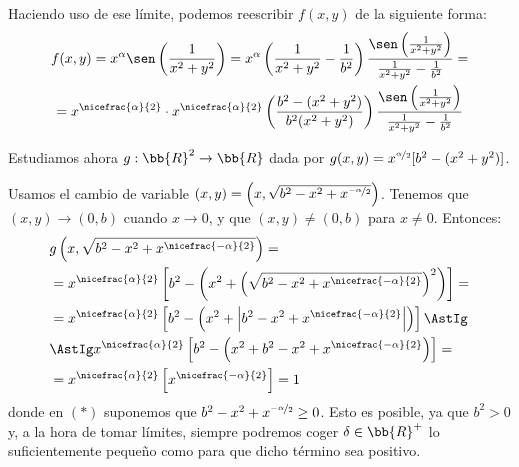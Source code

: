 \begin{ejercicio}
\begin{enumerate}
\begin{enumerate}
            Haciendo uso de ese límite, podemos reescribir $f(x,y)$ de la siguiente forma:
            \begin{multline*}
                f(x,y)=x^\alpha \sen\left(\frac{1}{x^2+y^2}\right)
                = x^\alpha \left(\frac{1}{x^2+y^2} - \frac{1}{b^2}\right) \frac{\sen\left(\frac{1}{x^2+y^2}\right)}{\frac{1}{x^2+y^2} - \frac{1}{b^2}}
                =\\= x^{\nicefrac{\alpha}{2}}\cdot x^{\nicefrac{\alpha}{2}} \left(\frac{b^2-(x^2+y^2)}{b^2(x^2+y^2)}\right) \frac{\sen\left(\frac{1}{x^2+y^2}\right)}{\frac{1}{x^2+y^2} - \frac{1}{b^2}}
            \end{multline*}

            Estudiamos ahora $g:\bb{R}^2\to \bb{R}$ dada por $g(x,y)=x^{\nicefrac{\alpha}{2}} [b^2-(x^2+y^2)]$.

            Usamos el cambio de variable $(x,y)=\left(x,\sqrt{b^2-x^2+x^{\nicefrac{-\alpha}{2}}}\right)$.
            Tenemos que $(x,y)\to (0,b)$ cuando $x\to 0$, y que $(x,y)\neq (0,b)$ para $x\neq 0$.
            Entonces:
            \begin{align*}
                &g\left(x,\sqrt{b^2-x^2+x^{\nicefrac{-\alpha}{2}}}\right)
                =\\&= x^{\nicefrac{\alpha}{2}} \left[b^2 - \left(x^2 + \left(\sqrt{b^2-x^2+x^{\nicefrac{-\alpha}{2}}}\right)^2\right)\right]
                =\\&= x^{\nicefrac{\alpha}{2}} \left[b^2 - \left(x^2 + \left|b^2-x^2+x^{\nicefrac{-\alpha}{2}}\right|\right)\right]
                \AstIg \\ &\AstIg
                x^{\nicefrac{\alpha}{2}} \left[b^2 - \left(x^2 + b^2-x^2+x^{\nicefrac{-\alpha}{2}}\right)\right]
                =\\&= x^{\nicefrac{\alpha}{2}} \left[x^{\nicefrac{-\alpha}{2}}\right]
                = 1
            \end{align*}
            donde en $(\ast)$ suponemos que $b^2-x^2+x^{\nicefrac{-\alpha}{2}}\geq 0$.
            Esto es posible, ya que $b^2>0$ y, a la hora de tomar límites, siempre podremos coger $\delta\in \bb{R}^+$
            lo suficientemente pequeño como para que dicho término sea positivo.


\end{enumerate}
\end{enumerate}
\end{ejercicio}
